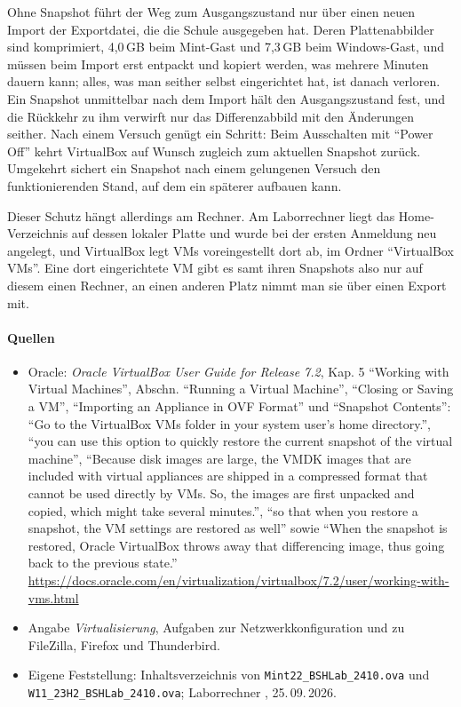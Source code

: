 Ohne Snapshot führt der Weg zum Ausgangszustand nur über einen neuen Import der Exportdatei, die die Schule ausgegeben hat. Deren Plattenabbilder sind komprimiert, 4,0\,GB beim Mint-Gast und 7,3\,GB beim Windows-Gast, und müssen beim Import erst entpackt und kopiert werden, was mehrere Minuten dauern kann; alles, was man seither selbst eingerichtet hat, ist danach verloren. Ein Snapshot unmittelbar nach dem Import hält den Ausgangszustand fest, und die Rückkehr zu ihm verwirft nur das Differenzabbild mit den Änderungen seither. Nach einem Versuch genügt ein Schritt: Beim Ausschalten mit \enquote{Power Off} kehrt VirtualBox auf Wunsch zugleich zum aktuellen Snapshot zurück. Umgekehrt sichert ein Snapshot nach einem gelungenen Versuch den funktionierenden Stand, auf dem ein späterer aufbauen kann.

Dieser Schutz hängt allerdings am Rechner. Am Laborrechner  liegt das Home-Verzeichnis auf dessen lokaler Platte und wurde bei der ersten Anmeldung neu angelegt, und VirtualBox legt VMs voreingestellt dort ab, im Ordner \enquote{VirtualBox VMs}. Eine dort eingerichtete VM gibt es samt ihren Snapshots also nur auf diesem einen Rechner, an einen anderen Platz nimmt man sie über einen Export mit.

\paragraph{Quellen}
\begin{itemize}[quellen]
  \item Oracle: \emph{Oracle VirtualBox User Guide for Release 7.2}, Kap. 5 \enquote{Working with Virtual Machines}, Abschn. \enquote{Running a Virtual Machine}, \enquote{Closing or Saving a VM}, \enquote{Importing an Appliance in OVF Format} und \enquote{Snapshot Contents}: \enquote{Go to the VirtualBox VMs folder in your system user's home directory.}, \enquote{you can use this option to quickly restore the current snapshot of the virtual machine}, \enquote{Because disk images are large, the VMDK images that are included with virtual appliances are shipped in a compressed format that cannot be used directly by VMs. So, the images are first unpacked and copied, which might take several minutes.}, \enquote{so that when you restore a snapshot, the VM settings are restored as well} sowie \enquote{When the snapshot is restored, Oracle VirtualBox throws away that differencing image, thus going back to the previous state.} \url{https://docs.oracle.com/en/virtualization/virtualbox/7.2/user/working-with-vms.html}
  \item Angabe \emph{Virtualisierung}, Aufgaben zur Netzwerkkonfiguration und zu FileZilla, Firefox und Thunderbird.
  \item Eigene Feststellung: Inhaltsverzeichnis von \nolinkurl{Mint22_BSHLab_2410.ova} und \nolinkurl{W11_23H2_BSHLab_2410.ova}; Laborrechner , 25.\,09.\,2026.
\end{itemize}
